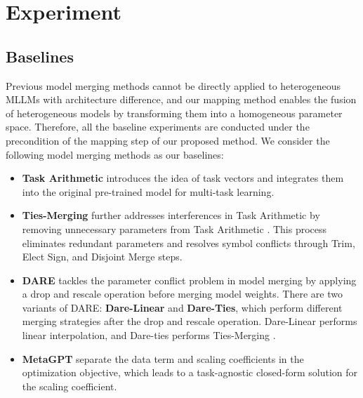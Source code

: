 \section{Experiment}

\label{sec:exp}
\subsection{Baselines}
Previous model merging methods cannot be directly applied to heterogeneous MLLMs with architecture difference, and our mapping method enables the fusion of heterogeneous models by transforming them into a homogeneous parameter space. Therefore, all the baseline experiments are conducted under the precondition of the mapping step of our proposed method. We consider the following model merging methods as our baselines:
\begin{itemize}


\item \textbf{Task Arithmetic} \cite{task-arithmetic} introduces the idea of task vectors and integrates them into the original pre-trained model for multi-task learning.

\item \textbf{Ties-Merging} \cite{ties} further addresses interferences in Task Arithmetic by removing unnecessary parameters from Task Arithmetic \cite{task-arithmetic}. This process eliminates redundant parameters and resolves symbol conflicts through Trim, Elect Sign, and Disjoint Merge steps.

\item \textbf{DARE} \cite{dare} tackles the parameter conflict problem in model merging by applying a drop and rescale operation before merging model weights. There are two variants of DARE: \textbf{Dare-Linear} and \textbf{Dare-Ties}, which perform different merging strategies after the drop and rescale operation. Dare-Linear performs linear interpolation, and Dare-ties performs Ties-Merging \cite{ties}.

\item \textbf{MetaGPT} \cite{metagpt} separate the data term and scaling coefficients in the optimization objective, which leads to a task-agnostic closed-form solution for the scaling coefficient.
    
\end{itemize}
